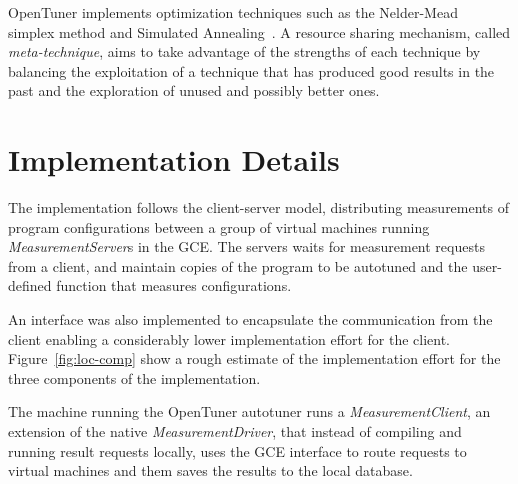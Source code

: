 \documentclass[12pt]{article}
\begin{document}
OpenTuner implements optimization techniques such as the
Nelder-Mead~\cite{nelder1965simplex} simplex method and Simulated
Annealing~\cite{kirkpatrick1983optimization}. A resource sharing mechanism,
called \emph{meta-technique}, aims to take advantage of the strengths of each
technique by balancing the exploitation of a technique that has produced good
results in the past and the exploration of unused and possibly better ones.


\section{Implementation Details}
\label{sec:ext}

The implementation follows the client-server model, distributing
measurements of program configurations between a group of virtual
machines running \emph{MeasurementServer}s in the GCE. The servers
waits for measurement requests from a client, and maintain copies
of the program to be autotuned and the user-defined function that
measures configurations.

An interface was also implemented to encapsulate the communication
from the client enabling a considerably lower implementation
effort for the client. Figure~\ref{fig:loc-comp} show a rough
estimate of the implementation effort for the three components
of the implementation.

The machine running the OpenTuner autotuner runs a \emph{MeasurementClient},
an extension of the native \emph{MeasurementDriver}, that instead of
compiling and running result requests locally, uses the GCE interface to
route requests to virtual machines and them saves the results to the local
database.
\end{document}
